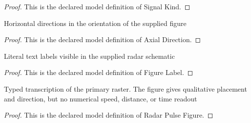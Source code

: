 \begin{proof}
  This is the declared model definition of Signal Kind.
\end{proof}
\begin{definition}
  \label{def:physics:phyx-mini-0593:phyxminiproblems-problemphyxmini0593-axialdirection}
  Horizontal directions in the orientation of the supplied figure
\end{definition}
\begin{proof}
  This is the declared model definition of Axial Direction.
\end{proof}
\begin{definition}
  \label{def:physics:phyx-mini-0593:phyxminiproblems-problemphyxmini0593-figurelabel}
  Literal text labels visible in the supplied radar schematic
\end{definition}
\begin{proof}
  This is the declared model definition of Figure Label.
\end{proof}
\begin{definition}
  \label{def:physics:phyx-mini-0593:phyxminiproblems-problemphyxmini0593-radarpulsefigure}
  Typed transcription of the primary raster. The figure gives qualitative placement and direction, but no numerical speed, distance, or time readout
\end{definition}
\begin{proof}
  This is the declared model definition of Radar Pulse Figure.
\end{proof}
